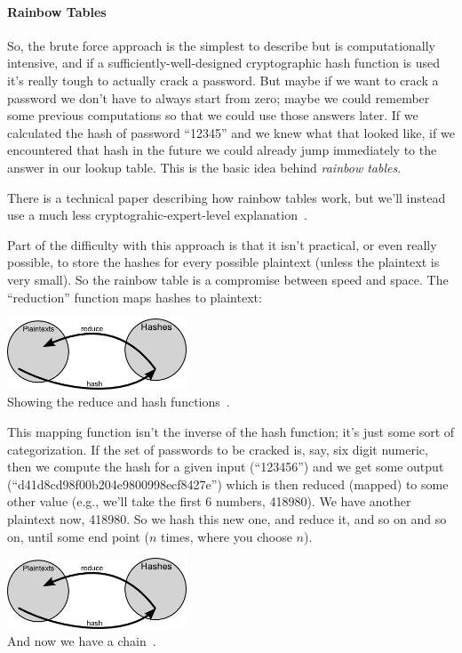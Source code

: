 \documentclass[a4paper]{report}
\begin{document}
\paragraph{Rainbow Tables} So, the brute force approach is the simplest to describe but is computationally intensive, and if a sufficiently-well-designed cryptographic hash function is used it's really tough to actually crack a password. But maybe if we want to crack a password we don't have to always start from zero; maybe we could remember some previous computations so that we could use those answers later. If we calculated the hash of password ``12345'' and we knew what that looked like, if we encountered that hash in the future we could already jump immediately to the answer in our lookup table. This is the basic idea behind \textit{rainbow tables}.

There is a technical paper describing how rainbow tables work, but we'll instead use a much less cryptograhic-expert-level explanation~\cite{rainbowtables}. 

Part of the difficulty with this approach is that it isn't practical, or even really possible, to store the hashes for every possible plaintext (unless the plaintext is very small). So the rainbow table is a compromise between speed and space. The ``reduction'' function maps hashes to plaintext:

\begin{center}
	\includegraphics[width=0.4\textwidth]{images/rainbow-tables-reduce.png}\\
	Showing the reduce and hash functions~\cite{rainbowtables}.
\end{center}

This mapping function isn't the inverse of the hash function; it's just some sort of categorization. If the set of passwords to be cracked is, say, six digit numeric, then we compute the hash for a given input (``123456'') and we get some output (``d41d8cd98f00b204e9800998ecf8427e'') which is then reduced (mapped) to some other value (e.g., we'll take the first 6 numbers, 418980). We have another plaintext now, 418980. So we hash this new one, and reduce it, and so on and so on, until some end point ($n$ times, where you choose $n$). 

\begin{center}
	\includegraphics[width=0.4\textwidth]{images/rainbow-tables-reduce.png}\\
	And now we have a chain~\cite{rainbowtables}.
\end{center}
\end{document}
